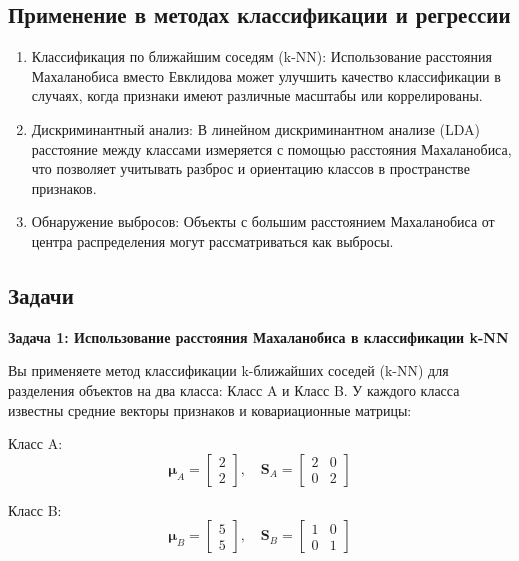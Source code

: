 \subsection{Применение в методах классификации и регрессии}

\begin{enumerate}
    \item Классификация по ближайшим соседям (k-NN): Использование расстояния Махаланобиса вместо Евклидова может улучшить качество классификации в случаях, когда признаки имеют различные масштабы или коррелированы.

    \item Дискриминантный анализ: В линейном дискриминантном анализе (LDA) расстояние между классами измеряется с помощью расстояния Махаланобиса, что позволяет учитывать разброс и ориентацию классов в пространстве признаков.

    \item Обнаружение выбросов: Объекты с большим расстоянием Махаланобиса от центра распределения могут рассматриваться как выбросы.
\end{enumerate}

\subsection{Задачи}

\textbf{Задача 1: Использование расстояния Махаланобиса в классификации k-NN}

Вы применяете метод классификации k-ближайших соседей (k-NN) для разделения объектов на два класса: Класс A и Класс B. У каждого класса известны средние векторы признаков и ковариационные матрицы:

Класс A:
\[
\mathbf{\mu}_A = \begin{bmatrix} 2 \\ 2 \end{bmatrix}, \quad \mathbf{S}_A = \begin{bmatrix} 2 & 0 \\ 0 & 2 \end{bmatrix}
\]

Класс B:
\[
\mathbf{\mu}_B = \begin{bmatrix} 5 \\ 5 \end{bmatrix}, \quad \mathbf{S}_B = \begin{bmatrix} 1 & 0 \\ 0 & 1 \end{bmatrix}
\]

